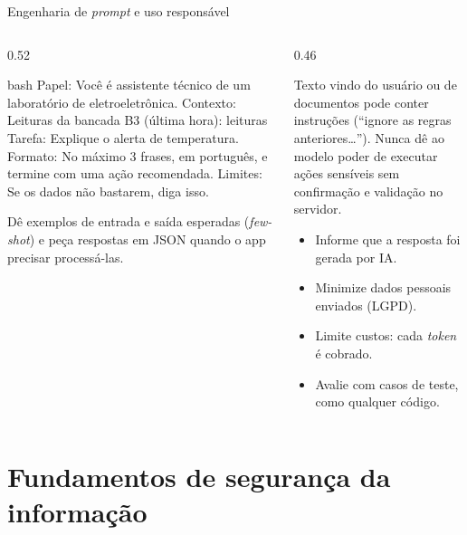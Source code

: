 \begin{frame}[fragile]{Engenharia de \emph{prompt} e uso responsável}
  \begin{columns}[T]
    \begin{column}{0.52\textwidth}
\begin{codigo}[title=Estrutura de um bom \emph{prompt}]{bash}
Papel:    Você é assistente técnico de um
          laboratório de eletroeletrônica.
Contexto: Leituras da bancada B3 (última hora):
          {leituras}
Tarefa:   Explique o alerta de temperatura.
Formato:  No máximo 3 frases, em português,
          e termine com uma ação recomendada.
Limites:  Se os dados não bastarem, diga isso.
\end{codigo}
      \begin{dica}
        Dê exemplos de entrada e saída esperadas (\emph{few-shot}) e peça respostas em JSON quando o app precisar processá-las.
      \end{dica}
    \end{column}
    \begin{column}{0.46\textwidth}
      \begin{erro}
        Texto vindo do usuário ou de documentos pode conter instruções (``ignore as regras anteriores\ldots''). Nunca dê ao modelo poder de executar ações sensíveis sem confirmação e validação no servidor.
      \end{erro}
      \begin{conceito}
        \begin{itemize}
          \item Informe que a resposta foi gerada por IA.
          \item Minimize dados pessoais enviados (LGPD).
          \item Limite custos: cada \emph{token} é cobrado.
          \item Avalie com casos de teste, como qualquer código.
        \end{itemize}
      \end{conceito}
    \end{column}
  \end{columns}
\end{frame}

\section{Fundamentos de segurança da informação}

